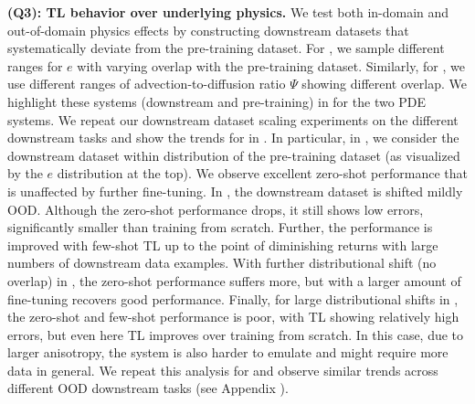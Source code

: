 \medskip
\noindent \textbf{(Q3): TL  behavior over underlying physics.} We test both in-domain and out-of-domain physics effects by constructing downstream datasets that systematically deviate from the pre-training dataset.  For \sysA{},  we sample different ranges for $e$ with varying overlap with the pre-training dataset. Similarly, for \sysB{}, we use different ranges of advection-to-diffusion ratio $\Psi$ showing different overlap. We highlight these systems (downstream and pre-training) in  for the two PDE systems.
%
We repeat our downstream dataset scaling experiments on the different downstream tasks and show the  trends for \sysA{} in .
In particular, in , we consider the downstream dataset within distribution of the pre-training dataset (as visualized by the $e$ distribution at the top). We observe excellent zero-shot performance that is unaffected by further fine-tuning. In , the downstream dataset is shifted mildly OOD. Although the zero-shot performance drops, it still shows low errors, significantly smaller than training from scratch. Further, the performance is improved with few-shot TL up to the point of diminishing returns with large numbers of downstream data examples. With further distributional shift (no overlap) in , the zero-shot performance suffers more, but with a larger amount of fine-tuning recovers good performance. Finally, for large distributional shifts in , the zero-shot and few-shot performance is poor, with TL showing relatively high errors, but even here TL improves over training from scratch.
In this case, due to larger anisotropy, the system is also harder to emulate and might require more data in general. We repeat this analysis for \sysB{} and observe similar trends across different OOD downstream tasks (see Appendix ).
% 
